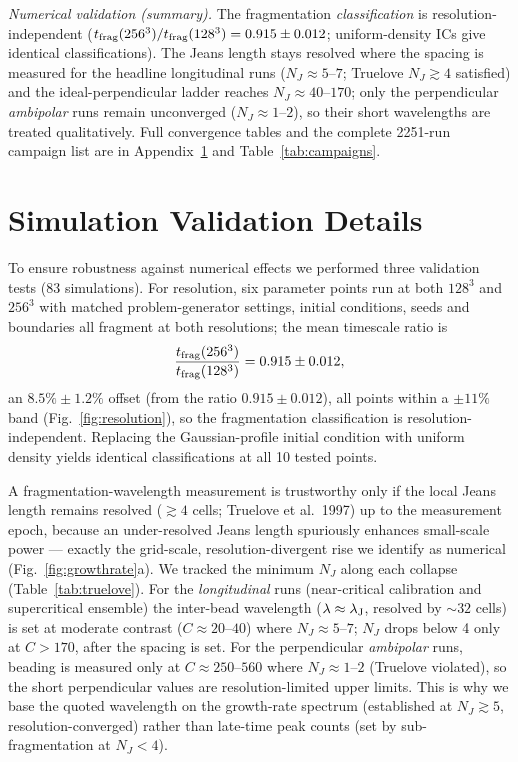 \documentclass[usenatbib,twoside,twocolumn]{mnras}
\begin{document}
\emph{Numerical validation (summary).} The fragmentation \emph{classification} is resolution-independent ($t_{\rm frag}(256^3)/t_{\rm frag}(128^3)=0.915\pm0.012$; uniform-density ICs give identical classifications). The Jeans length stays resolved where the spacing is measured for the headline longitudinal runs ($N_J\approx5$--$7$; Truelove $N_J\gtrsim4$ satisfied) and the ideal-perpendicular ladder reaches $N_J\approx40$--$170$; only the perpendicular \emph{ambipolar} runs remain unconverged ($N_J\approx1$--$2$), so their short wavelengths are treated qualitatively. Full convergence tables and the complete 2251-run campaign list are in Appendix~\ref{sec:validation} and Table~\ref{tab:campaigns}.


\section{Simulation Validation Details}
\label{sec:validation}

To ensure robustness against numerical effects we performed three validation tests (83 simulations). For resolution, six parameter points run at both $128^3$ and $256^3$ with matched problem-generator settings, initial conditions, seeds and boundaries all fragment at both resolutions; the mean timescale ratio is
\begin{equation}
\frac{t_{\rm frag}(256^3)}{t_{\rm frag}(128^3)} = 0.915 \pm 0.012,
\end{equation}
an $8.5\%\pm1.2\%$ offset (from the ratio $0.915\pm0.012$), all points within a $\pm11\%$ band (Fig.~\ref{fig:resolution}), so the fragmentation classification is resolution-independent. Replacing the Gaussian-profile initial condition with uniform density yields identical classifications at all 10 tested points.

A fragmentation-wavelength measurement is trustworthy only if the local Jeans length remains resolved ($\gtrsim4$ cells; Truelove et al.\ 1997) up to the measurement epoch, because an under-resolved Jeans length spuriously enhances small-scale power --- exactly the grid-scale, resolution-divergent rise we identify as numerical (Fig.~\ref{fig:growthrate}a). We tracked the minimum $N_J$ along each collapse (Table~\ref{tab:truelove}). For the \emph{longitudinal} runs (near-critical calibration and supercritical ensemble) the inter-bead wavelength ($\lambda\approx\lambda_{\rm J}$, resolved by $\sim32$ cells) is set at moderate contrast ($C\approx20$--$40$) where $N_J\approx5$--$7$; $N_J$ drops below 4 only at $C>170$, after the spacing is set. For the perpendicular \emph{ambipolar} runs, beading is measured only at $C\approx250$--$560$ where $N_J\approx1$--$2$ (Truelove violated), so the short perpendicular values are resolution-limited upper limits. This is why we base the quoted wavelength on the growth-rate spectrum (established at $N_J\gtrsim5$, resolution-converged) rather than late-time peak counts (set by sub-fragmentation at $N_J<4$).
\end{document}
